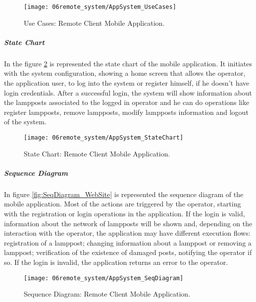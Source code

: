\begin{figure}[H]
	\centering
	\texttt{[image: 06remote\_system/AppSystem\_UseCases]}
	\caption{Use Cases: Remote Client Mobile Application.}
	\label{fig:UseCases_application}
\end{figure}

\subparagraph*{State Chart}
In the figure \ref{fig:StateChart_application} is represented the state chart of the mobile application. It initiates with the system configuration, showing a home screen that allows the operator, the application user, to log into the system or register himself, if he doesn’t have login credentials. After a successful login, the system will show information about the lampposts associated to the logged in operator and he can do operations like register lampposts, remove lampposts, modify lampposts information and logout of the system.

\begin{figure}[H]
	\centering
	\texttt{[image: 06remote\_system/AppSystem\_StateChart]}
	\caption{State Chart: Remote Client Mobile Application.}
	\label{fig:StateChart_application}
\end{figure}


\subparagraph*{Sequence Diagram}
In figure \ref{fig:SeqDiagram_WebSite} is represented the sequence diagram of the mobile application. Most of the actions are triggered by the operator, starting with the registration or login operations in the application. If the login is valid, information about the network of lampposts will be shown and, depending on the interaction with the operator, the application may have different execution flows: registration of a lamppost; changing information about a lamppost or removing a lamppost; verification of the existence of damaged posts, notifying the operator if so. If the login is invalid, the application returns an error to the operator.

\begin{figure}[H]
	\centering
	\texttt{[image: 06remote\_system/AppSystem\_SeqDiagram]}
	\caption{Sequence Diagram: Remote Client Mobile Application.}
	\label{fig:SeqDiagram_application}
\end{figure}
